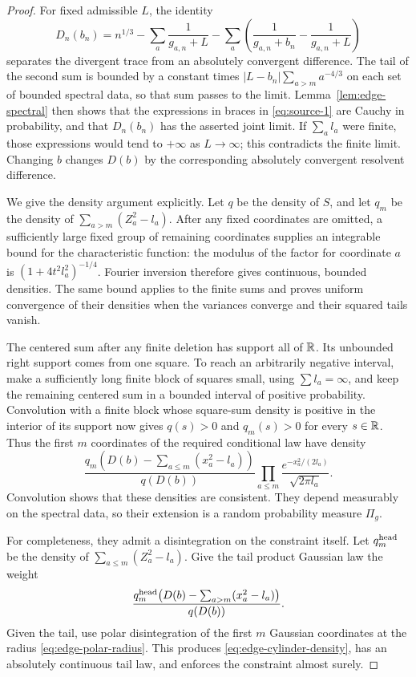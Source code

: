 \begin{proof}
For fixed admissible $L$, the identity
\[
 D_n(b_n)=n^{1/3}-\sum_a\frac1{g_{a,n}+L}
 -\sum_a\left(\frac1{g_{a,n}+b_n}-\frac1{g_{a,n}+L}\right)
\]
separates the divergent trace from an absolutely convergent difference.
The tail of the second sum is bounded by a constant times
$|L-b_n|\sum_{a>m}a^{-4/3}$ on each set of bounded spectral data, so that
sum passes to the limit.  Lemma~\ref{lem:edge-spectral} then shows that the
expressions in braces in \eqref{eq:source-1} are Cauchy in probability,
and that $D_n(b_n)$ has the asserted joint limit.  If $\sum_a l_a$ were
finite, those expressions would tend to $+\infty$ as $L\to\infty$;
this contradicts the finite limit.  Changing $b$ changes $D(b)$ by the
corresponding absolutely convergent resolvent difference.

We give the density argument explicitly.  Let $q$ be the density of $S$,
and let $q_m$ be the density of $\sum_{a>m}(Z_a^2-l_a)$.
After any fixed coordinates are omitted, a sufficiently large fixed group
of remaining coordinates supplies an integrable bound for the characteristic
function: the modulus of the factor for coordinate $a$ is
$(1+4t^2l_a^2)^{-1/4}$.  Fourier inversion therefore gives continuous,
bounded densities.  The same bound applies to the finite sums and proves
uniform convergence of their densities when the variances converge and
their squared tails vanish.

The centered sum after any finite deletion has support all of $\mathbb R$.
Its unbounded right support comes from one square.  To reach an arbitrarily
negative interval, make a sufficiently long finite block of squares small,
using $\sum l_a=\infty$, and keep the remaining centered sum in a bounded
interval of positive probability.  Convolution with a finite block whose
square-sum density is positive in the interior of its support now gives
$q(s)>0$ and $q_m(s)>0$ for every $s\in\mathbb R$.  Thus the first $m$
coordinates of the required conditional law have density
\begin{equation}\label{eq:edge-cylinder-density}
 \frac{q_m\!\left(D(b)-\sum_{a\le m}(x_a^2-l_a)\right)}{q(D(b))}
 \prod_{a\le m}\frac{e^{-x_a^2/(2l_a)}}{\sqrt{2\pi l_a}}.
\end{equation}
Convolution shows that these densities are consistent.  They depend
measurably on the spectral data, so their extension is a random probability
measure $\Pi_g$.

For completeness, they admit a disintegration on the constraint itself.
Let $q^{\rm head}_m$ be the density of
$\sum_{a\le m}(Z_a^2-l_a)$.  Give the tail product Gaussian law the
weight
\[
 \frac{q^{\rm head}_m\!\left(D(b)-\sum_{a>m}(x_a^2-l_a)\right)}{q(D(b))}.
\]
Given the tail, use polar disintegration of the first $m$ Gaussian
coordinates at the radius \eqref{eq:edge-polar-radius}.  This produces
\eqref{eq:edge-cylinder-density}, has an absolutely continuous tail law,
and enforces the constraint almost surely.


\end{proof}
